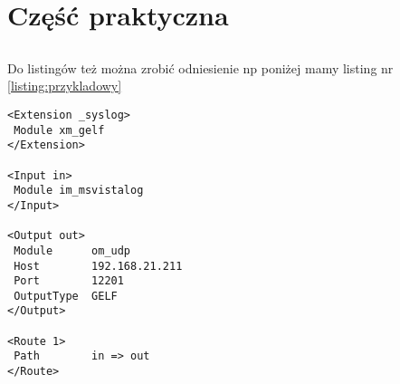 \chapter{Część praktyczna}

\section{}

\subsection{}

Do listingów też można zrobić odniesienie np poniżej mamy listing nr \ref{listing:przykladowy}

\renewcommand{\lstlistingname}{Listing}

\begin{lstlisting}[caption=Przykładowy listing pliku konfiguracyjnego , label=listing:przykladowy]
<Extension _syslog>
 Module xm_gelf
</Extension>

<Input in>
 Module	im_msvistalog
</Input>

<Output out>
 Module      om_udp
 Host        192.168.21.211
 Port        12201
 OutputType  GELF
</Output>

<Route 1>
 Path        in => out
</Route>
\end{lstlisting}

\let\cleardoublepage\clearpage
